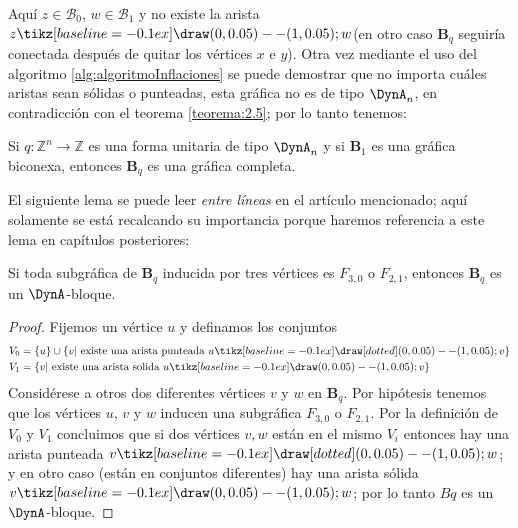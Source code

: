 \begin{figure}[h]
   \centering%
\end{figure}

Aquí $z \in \mathcal{B}_{0}$, $w \in \mathcal{B}_{1}$ y no existe la arista $z \tikz[baseline=-0.1ex]\draw (0,0.05) -- (1,0.05); w$(en otro caso $\textbf{B}_{q}$ seguiría conectada después de quitar los vértices $x$ e $y$). Otra vez mediante el uso del algoritmo \ref{alg:algoritmoInflaciones} se puede demostrar que no importa cuáles aristas sean sólidas o punteadas, esta gráfica no es de tipo $\DynA_{n}$, en contradicción con el teorema \ref{teorema:2.5}; por lo tanto tenemos:\\

\begin{lemma}
Si $q:\mathbb{Z}^{n} \rightarrow \mathbb{Z}$ es una forma unitaria de tipo $\DynA_{n}$ y si $\textbf{B}_{1}$ es una gráfica biconexa, entonces $\textbf{B}_{q}$ es una gráfica completa.
\label{lema:2.7}
\end{lemma}

El siguiente lema se puede leer \textit{entre líneas} en el artículo mencionado; aquí solamente se está recalcando su importancia porque haremos referencia a este lema en capítulos posteriores:

\begin{lemma}
Si toda subgráfica de $\textbf{B}_{q}$ inducida por tres vértices es $F_{3,0}$ o $F_{2,1}$, entonces $\textbf{B}_{q}$ es un $\DynA$-bloque.
\label{lema:2.8}
\end{lemma}

\begin{proof}
Fijemos un vértice $u$ y definamos los conjuntos
\begin{equation*}
\begin{split}
V_{0} & = \{u\} \cup \{v |  \mbox{  existe una arista punteada } u \tikz[baseline=-0.1ex]\draw[dotted] (0,0.05) -- (1,0.05); v\}\\
V_{1} & = \{v |  \mbox{ existe una arista solida } u \tikz[baseline=-0.1ex]\draw (0,0.05) -- (1,0.05); v\}
\end{split}
\end{equation*}
Considérese a otros dos diferentes vértices $v$ y $w$ en $\textbf{B}_{q}$. Por hipótesis tenemos que los vértices $u$, $v$ y $w$ inducen una subgráfica $F_{3,0}$ o $F_{2,1}$. Por la definición de $V_{0}$ y $V_{1}$ concluimos que si dos vértices $v, w$ están en el mismo $V_{i}$ entonces hay una arista punteada $v \tikz[baseline=-0.1ex]\draw[dotted](0,0.05) -- (1,0.05); w$; y en otro caso (están en conjuntos diferentes) hay una arista sólida $v \tikz[baseline=-0.1ex]\draw(0,0.05) -- (1,0.05); w$; por lo tanto $Bq$ es un $\DynA$-bloque.
\end{proof}

